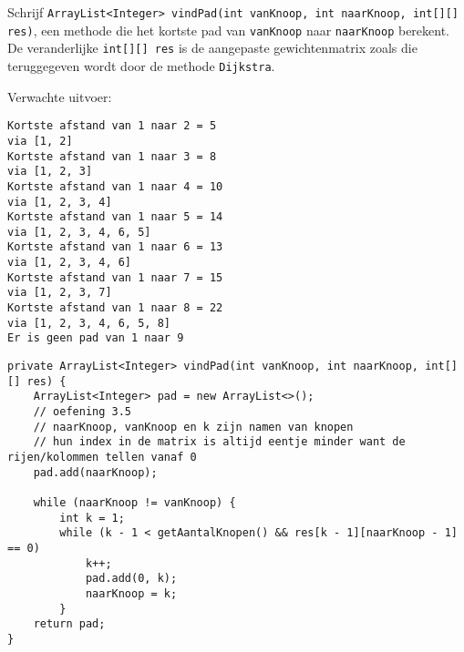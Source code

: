 \begin{oef}
\code Schrijf \verb/ArrayList<Integer> vindPad(int vanKnoop, int naarKnoop, int[][] res)/, een methode die het kortste pad van \verb/vanKnoop/ naar \verb/naarKnoop/ berekent. De veranderlijke \verb/int[][] res/ is de aangepaste gewichtenmatrix zoals die teruggegeven wordt door de methode \verb/Dijkstra/.

Verwachte uitvoer:
\begin{lstlisting}
Kortste afstand van 1 naar 2 = 5
via [1, 2]
Kortste afstand van 1 naar 3 = 8
via [1, 2, 3]
Kortste afstand van 1 naar 4 = 10
via [1, 2, 3, 4]
Kortste afstand van 1 naar 5 = 14
via [1, 2, 3, 4, 6, 5]
Kortste afstand van 1 naar 6 = 13
via [1, 2, 3, 4, 6]
Kortste afstand van 1 naar 7 = 15
via [1, 2, 3, 7]
Kortste afstand van 1 naar 8 = 22
via [1, 2, 3, 4, 6, 5, 8]
Er is geen pad van 1 naar 9
\end{lstlisting}
\begin{opl}
\begin{lstlisting}[caption=vindPad, label=DijkstravindPad]
private ArrayList<Integer> vindPad(int vanKnoop, int naarKnoop, int[][] res) {
    ArrayList<Integer> pad = new ArrayList<>();
    // oefening 3.5
    // naarKnoop, vanKnoop en k zijn namen van knopen
    // hun index in de matrix is altijd eentje minder want de rijen/kolommen tellen vanaf 0
    pad.add(naarKnoop);

    while (naarKnoop != vanKnoop) {
        int k = 1;
        while (k - 1 < getAantalKnopen() && res[k - 1][naarKnoop - 1] == 0)
            k++;
            pad.add(0, k);
            naarKnoop = k;
        }
    return pad;
}
\end{lstlisting}
\end{opl}

\end{oef}




